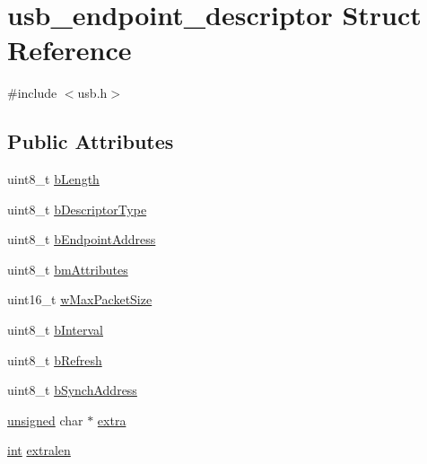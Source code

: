 \hypertarget{structusb__endpoint__descriptor}{\section{usb\-\_\-endpoint\-\_\-descriptor Struct Reference}
\label{structusb__endpoint__descriptor}
}


{\ttfamily \#include $<$usb.\-h$>$}

\subsection*{Public Attributes}
\begin{DoxyCompactItemize}
\item 
uint8\-\_\-t \hyperlink{structusb__endpoint__descriptor_aac9ff1940e27153339becfd460c5b796}{b\-Length}
\item 
uint8\-\_\-t \hyperlink{structusb__endpoint__descriptor_aa6e24b3aa0c8130a4d39f2133ac5ed12}{b\-Descriptor\-Type}
\item 
uint8\-\_\-t \hyperlink{structusb__endpoint__descriptor_a5007051761d339b5bb27268a016947a5}{b\-Endpoint\-Address}
\item 
uint8\-\_\-t \hyperlink{structusb__endpoint__descriptor_a938a8fb34155743b6a68b64a79235538}{bm\-Attributes}
\item 
uint16\-\_\-t \hyperlink{structusb__endpoint__descriptor_a0b665a4fbe5daf9ede7ae18d75e1c744}{w\-Max\-Packet\-Size}
\item 
uint8\-\_\-t \hyperlink{structusb__endpoint__descriptor_a8fbc4ec9a4230f70729db036cfc07c44}{b\-Interval}
\item 
uint8\-\_\-t \hyperlink{structusb__endpoint__descriptor_a8fd9ef4655b60deacaa7e9b6d761c06e}{b\-Refresh}
\item 
uint8\-\_\-t \hyperlink{structusb__endpoint__descriptor_aa65273b135b778ec68bf7a647a91baaa}{b\-Synch\-Address}
\item 
\hyperlink{curses_8priv_8h_aca40206900cfc164654362fa8d4ad1e6}{unsigned} char $\ast$ \hyperlink{structusb__endpoint__descriptor_a63b845c524a4c8e0d3fe40c834a39367}{extra}
\item 
\hyperlink{term__entry_8h_ad65b480f8c8270356b45a9890f6499ae}{int} \hyperlink{structusb__endpoint__descriptor_ad21f23975ef6f28490dd00ec44d3f404}{extralen}
\end{DoxyCompactItemize}



